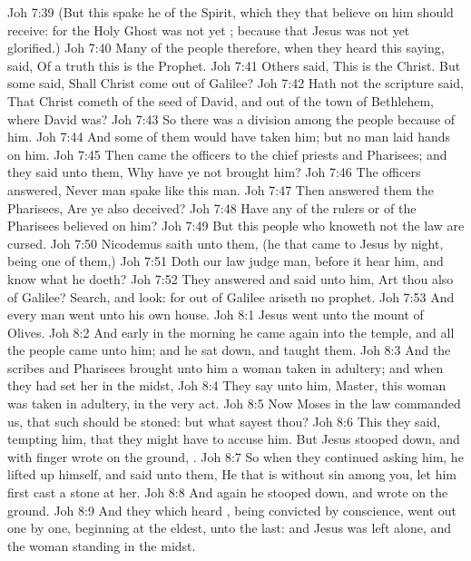 \vs Joh 7:39 (But this spake he of the Spirit, which they that believe on him should receive: for the Holy Ghost was not yet ; because that Jesus was not yet glorified.)
\vs Joh 7:40 Many of the people therefore, when they heard this saying, said, Of a truth this is the Prophet.
\vs Joh 7:41 Others said, This is the Christ. But some said, Shall Christ come out of Galilee?
\vs Joh 7:42 Hath not the scripture said, That Christ cometh of the seed of David, and out of the town of Bethlehem, where David was?
\vs Joh 7:43 So there was a division among the people because of him.
\vs Joh 7:44 And some of them would have taken him; but no man laid hands on him.
\vs Joh 7:45 Then came the officers to the chief priests and Pharisees; and they said unto them, Why have ye not brought him?
\vs Joh 7:46 The officers answered, Never man spake like this man.
\vs Joh 7:47 Then answered them the Pharisees, Are ye also deceived?
\vs Joh 7:48 Have any of the rulers or of the Pharisees believed on him?
\vs Joh 7:49 But this people who knoweth not the law are cursed.
\vs Joh 7:50 Nicodemus saith unto them, (he that came to Jesus by night, being one of them,)
\vs Joh 7:51 Doth our law judge  man, before it hear him, and know what he doeth?
\vs Joh 7:52 They answered and said unto him, Art thou also of Galilee? Search, and look: for out of Galilee ariseth no prophet.
\vs Joh 7:53 And every man went unto his own house.
\vs Joh 8:1 Jesus went unto the mount of Olives.
\vs Joh 8:2 And early in the morning he came again into the temple, and all the people came unto him; and he sat down, and taught them.
\vs Joh 8:3 And the scribes and Pharisees brought unto him a woman taken in adultery; and when they had set her in the midst,
\vs Joh 8:4 They say unto him, Master, this woman was taken in adultery, in the very act.
\vs Joh 8:5 Now Moses in the law commanded us, that such should be stoned: but what sayest thou?
\vs Joh 8:6 This they said, tempting him, that they might have to accuse him. But Jesus stooped down, and with  finger wrote on the ground, .
\vs Joh 8:7 So when they continued asking him, he lifted up himself, and said unto them, He that is without sin among you, let him first cast a stone at her.
\vs Joh 8:8 And again he stooped down, and wrote on the ground.
\vs Joh 8:9 And they which heard , being convicted by  conscience, went out one by one, beginning at the eldest,  unto the last: and Jesus was left alone, and the woman standing in the midst.
